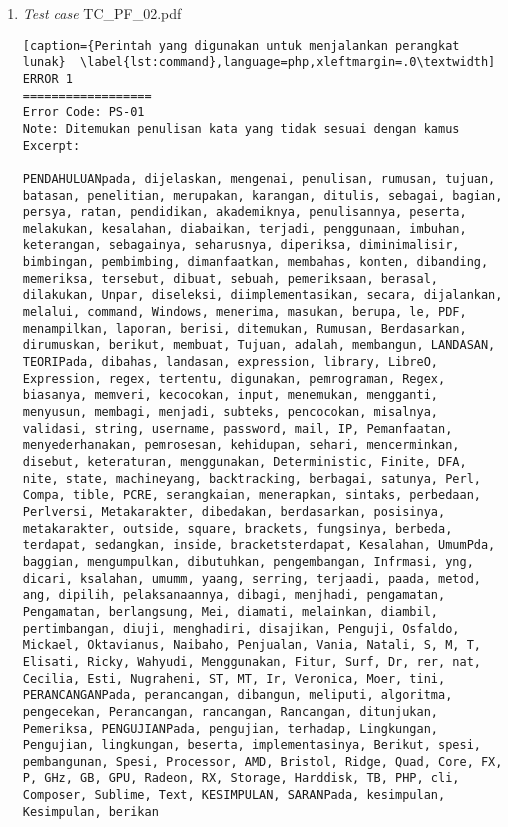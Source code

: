 \begin{enumerate}
	\item \textit{Test case} TC\_PF\_02.pdf

\begin{lstlisting}[caption={Perintah yang digunakan untuk menjalankan perangkat lunak}	\label{lst:command},language=php,xleftmargin=.0\textwidth]
ERROR 1
==================
Error Code: PS-01
Note: Ditemukan penulisan kata yang tidak sesuai dengan kamus
Excerpt: 

PENDAHULUANpada, dijelaskan, mengenai, penulisan, rumusan, tujuan, batasan, penelitian, merupakan, karangan, ditulis, sebagai, bagian, persya, ratan, pendidikan, akademiknya, penulisannya, peserta, melakukan, kesalahan, diabaikan, terjadi, penggunaan, imbuhan, keterangan, sebagainya, seharusnya, diperiksa, diminimalisir, bimbingan, pembimbing, dimanfaatkan, membahas, konten, dibanding, memeriksa, tersebut, dibuat, sebuah, pemeriksaan, berasal, dilakukan, Unpar, diseleksi, diimplementasikan, secara, dijalankan, melalui, command, Windows, menerima, masukan, berupa, le, PDF, menampilkan, laporan, berisi, ditemukan, Rumusan, Berdasarkan, dirumuskan, berikut, membuat, Tujuan, adalah, membangun, LANDASAN, TEORIPada, dibahas, landasan, expression, library, LibreO, Expression, regex, tertentu, digunakan, pemrograman, Regex, biasanya, memveri, kecocokan, input, menemukan, mengganti, menyusun, membagi, menjadi, subteks, pencocokan, misalnya, validasi, string, username, password, mail, IP, Pemanfaatan, menyederhanakan, pemrosesan, kehidupan, sehari, mencerminkan, disebut, keteraturan, menggunakan, Deterministic, Finite, DFA, nite, state, machineyang, backtracking, berbagai, satunya, Perl, Compa, tible, PCRE, serangkaian, menerapkan, sintaks, perbedaan, Perlversi, Metakarakter, dibedakan, berdasarkan, posisinya, metakarakter, outside, square, brackets, fungsinya, berbeda, terdapat, sedangkan, inside, bracketsterdapat, Kesalahan, UmumPda, baggian, mengumpulkan, dibutuhkan, pengembangan, Infrmasi, yng, dicari, ksalahan, umumm, yaang, serring, terjaadi, paada, metod, ang, dipilih, pelaksanaannya, dibagi, menjhadi, pengamatan, Pengamatan, berlangsung, Mei, diamati, melainkan, diambil, pertimbangan, diuji, menghadiri, disajikan, Penguji, Osfaldo, Mickael, Oktavianus, Naibaho, Penjualan, Vania, Natali, S, M, T, Elisati, Ricky, Wahyudi, Menggunakan, Fitur, Surf, Dr, rer, nat, Cecilia, Esti, Nugraheni, ST, MT, Ir, Veronica, Moer, tini, PERANCANGANPada, perancangan, dibangun, meliputi, algoritma, pengecekan, Perancangan, rancangan, Rancangan, ditunjukan, Pemeriksa, PENGUJIANPada, pengujian, terhadap, Lingkungan, Pengujian, lingkungan, beserta, implementasinya, Berikut, spesi, pembangunan, Spesi, Processor, AMD, Bristol, Ridge, Quad, Core, FX, P, GHz, GB, GPU, Radeon, RX, Storage, Harddisk, TB, PHP, cli, Composer, Sublime, Text, KESIMPULAN, SARANPada, kesimpulan, Kesimpulan, berikan
\end{lstlisting}
\end{enumerate}

